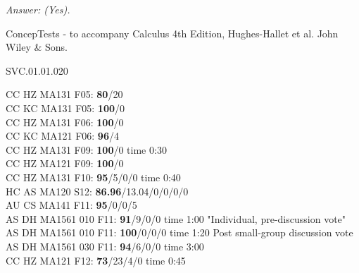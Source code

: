 {\it Answer: (Yes).} 

 

\medskip
ConcepTests - to accompany Calculus 4th Edition, Hughes-Hallet et al. John Wiley \& Sons.

SVC.01.01.020



CC HZ MA131 F05: {\bf80}/20 \\
CC KC MA131 F05: {\bf100}/0 \\
CC HZ MA131 F06: {\bf 100}/0 \\
CC KC MA121 F06: {\bf96}/4 \\
CC HZ MA131 F09: {\bf 100}/0 time 0:30  \\
CC HZ MA121 F09: {\bf 100}/0  \\
CC HZ MA131 F10: {\bf 95}/5/0/0 time 0:40  \\
HC AS MA120 S12: {\bf 86.96}/13.04/0/0/0/0  \\
AU CS MA141 F11: {\bf 95}/0/0/5  \\
AS DH MA1561 010 F11: {\bf 91}/9/0/0 time 1:00 "Individual, pre-discussion vote" \\
AS DH MA1561 010 F11: {\bf 100}/0/0/0 time 1:20 Post small-group discussion vote \\
AS DH MA1561 030 F11: {\bf 94}/6/0/0 time 3:00  \\
CC HZ MA121 F12: {\bf 73}/23/4/0 time 0:45  \\
